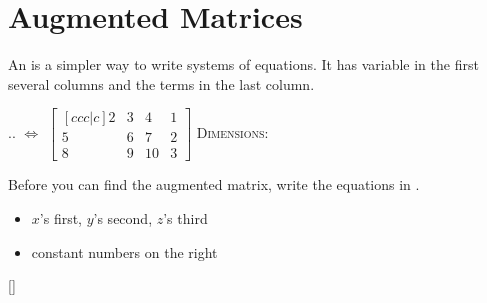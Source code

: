 \section{Augmented Matrices}

An   is a simpler way to write systems of equations.
It has variable  in the first several columns 
and the  terms in the last column.

\hfil
{
  \sysdelim..
{
  \LARGE
  $\Longleftrightarrow$
}
{
    \large
  \(
    \begin{bmatrix}[ccc|c]
      2 & 3 & 4 & 1\\
      5 & 6 & 7 & 2\\
      8 & 9 & 10 & 3
    \end{bmatrix}
  \)
}
}
{\scshape Dimensions:} 
\hfil 

\begin{tcolorbox}[center,width=6.5in]
    \large
    Before you can find the augmented matrix,
    write the equations in  .
    \begin{itemize}[nosep]
      \item $x$'s first, $y$'s second, $z$'s third 
      \item constant numbers on the right
    \end{itemize}
\end{tcolorbox}

[\large]
